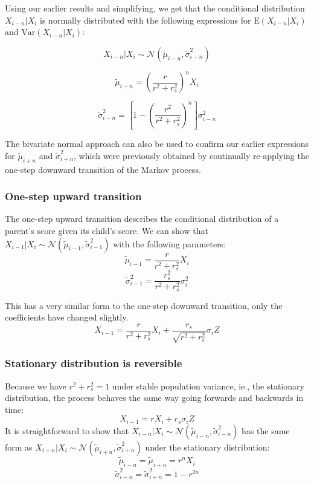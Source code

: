 \documentclass[a4paper,11pt]{article} %
\begin{document}
Using our earlier results and simplifying, we get that the conditional distribution $X_{i-n}|X_i$ is normally distributed with the following expressions for $\mathrm{E}(X_{i-n}|X_i)$ and $\mathrm{Var}(X_{i-n}|X_i)$:

$$X_{i-n}|X_i \sim \mathcal{N}( \tilde{\mu}_{i-n}, \tilde{\sigma}_{i-n}^2)$$

$$\tilde{\mu}_{i-n} = (\frac{r}{r^2+r_s^2})^n X_i$$

$$\tilde{\sigma}_{i-n}^2 = [1 - (\frac{r^2}{r^2+r_s^2})^n] \sigma_{i-n}^2$$

The bivariate normal approach can also be used to confirm our earlier expressions for $\tilde{\mu}_{i+n}$ and $\tilde{\sigma}_{i+n}^2$, which were previously obtained by continually re-applying the one-step downward transition of the Markov process.

\subsubsection*{One-step upward transition}
The one-step upward transition describes the conditional distribution of a parent's score given its child's score. We can show that $X_{i-1}|X_i \sim \mathcal{N}( \tilde{\mu}_{i-1}, \tilde{\sigma}_{i-1}^2)$ with the following parameters:
$$\tilde{\mu}_{i-1} = \frac{r}{r^2+r_s^2} X_i$$
$$\tilde{\sigma}_{i-1}^2 = \frac{r_s^2}{r^2+r_s^2} \sigma_i^2$$

This has a very similar form to the one-step downward transition, only the coefficients have changed slightly.
$$X_{i-1} = \frac{r}{r^2+r_s^2} X_i + \frac{r_s}{\sqrt{r^2+r_s^2}} \sigma_{i} Z$$


\subsubsection*{Stationary distribution is reversible}

Because we have $r^2+r_s^2 = 1$ under stable population variance, ie., the stationary distribution, the process behaves the same way going forwards and backwards in time:
$$X_{i-1} = r X_i + r_s \sigma_{i} Z$$
It is straightforward to show that $X_{i-n}|X_i \sim \mathcal{N}( \tilde{\mu}_{i-n}, \tilde{\sigma}_{i-n}^2)$ has the same form as $X_{i+n}|X_i \sim \mathcal{N}( \tilde{\mu}_{i+n}, \tilde{\sigma}_{i+n}^2)$ under the stationary distribution:
$$\tilde{\mu}_{i-n} = \tilde{\mu}_{i+n} = r^nX_i$$
$$\tilde{\sigma}_{i-n}^2 = \tilde{\sigma}_{i+n}^2 = 1-r^{2n}$$
\end{document}
